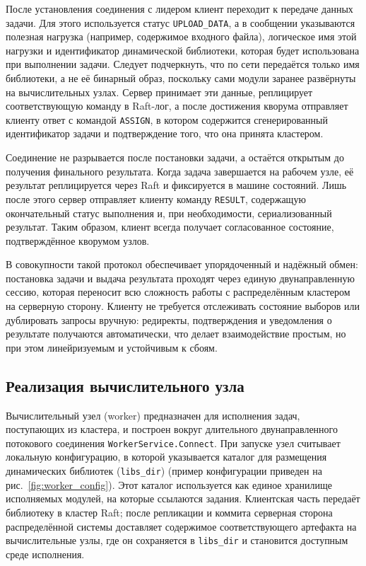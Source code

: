 После установления соединения с лидером клиент переходит к передаче данных
задачи. Для этого используется статус \texttt{UPLOAD\_DATA}, а в сообщении
указываются полезная нагрузка (например, содержимое входного файла),
логическое имя этой нагрузки и идентификатор динамической библиотеки, которая
будет использована при выполнении задачи. Следует подчеркнуть, что по сети
передаётся только имя библиотеки, а не её бинарный образ, поскольку сами
модули заранее развёрнуты на вычислительных узлах. Сервер принимает эти данные,
реплицирует соответствующую команду в Raft-лог, а после достижения кворума
отправляет клиенту ответ с командой \texttt{ASSIGN}, в котором содержится
сгенерированный идентификатор задачи и подтверждение того, что она принята
кластером.

Соединение не разрывается после постановки задачи, а остаётся открытым до
получения финального результата. Когда задача завершается на рабочем узле, её
результат реплицируется через Raft и фиксируется в машине состояний. Лишь
после этого сервер отправляет клиенту команду \texttt{RESULT}, содержащую
окончательный статус выполнения и, при необходимости, сериализованный результат.
Таким образом, клиент всегда получает согласованное состояние, подтверждённое
кворумом узлов.

В совокупности такой протокол обеспечивает упорядоченный и надёжный обмен:
постановка задачи и выдача результата проходят через единую двунаправленную
сессию, которая переносит всю сложность работы с распределённым кластером на
серверную сторону. Клиенту не требуется отслеживать состояние выборов или
дублировать запросы вручную: редиректы, подтверждения и уведомления о результате
получаются автоматически, что делает взаимодействие простым, но при этом
линейризуемым и устойчивым к сбоям.

\subsection{Реализация вычислительного узла}

Вычислительный узел (worker) предназначен для исполнения задач, поступающих из
кластера, и построен вокруг длительного двунаправленного потокового соединения
\texttt{WorkerService.Connect}. При запуске узел считывает локальную
конфигурацию, в которой указывается каталог для размещения динамических
библиотек (\texttt{libs\_dir}) (пример конфигурации приведен на
рис.~\ref{fig:worker_config}). Этот каталог используется как единое хранилище
исполняемых модулей, на которые ссылаются задания. Клиентская часть передаёт
библиотеку в кластер Raft; после репликации и коммита серверная сторона
распределённой системы доставляет содержимое соответствующего артефакта на
вычислительные узлы, где он сохраняется в \texttt{libs\_dir} и становится
доступным среде исполнения.

